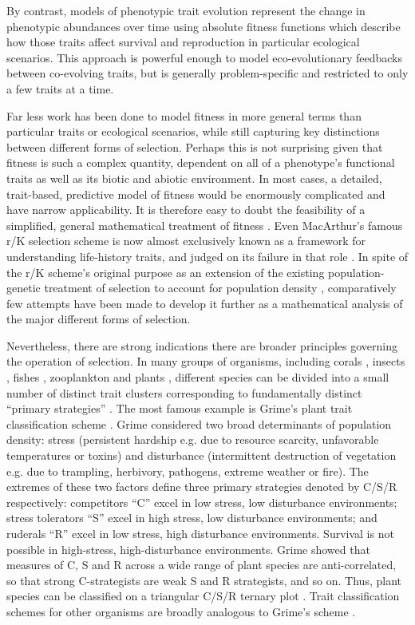 \documentclass[11pt]{article}
\begin{document}
By contrast, models of phenotypic trait evolution represent the change in phenotypic abundances over time using absolute fitness functions which describe how those traits affect survival and reproduction in particular ecological scenarios. This approach is powerful enough to model eco-evolutionary feedbacks between co-evolving traits, but is generally problem-specific and restricted to only a few traits at a time.

Far less work has been done to model fitness in more general terms than particular traits or ecological scenarios, while still capturing key distinctions between different forms of selection. Perhaps this is not surprising given that fitness is such a complex quantity, dependent on all of a phenotype's functional traits \citep{violle_2007} as well as its biotic and abiotic environment. In most cases, a detailed, trait-based, predictive model of fitness would be enormously complicated and have narrow applicability. It is therefore easy to doubt the feasibility of a simplified, general mathematical treatment of fitness \citep[p. 276]{ewens_2012}. Even MacArthur's famous r/K selection scheme is now almost exclusively known as a framework for understanding life-history traits, and judged on its failure in that role \citep{pianka_1970,stearns_1977,boyce_1984,reznick_2002}. In spite of the r/K scheme's original purpose as an extension of the existing population-genetic treatment of selection to account for population density \citep{macarthur_1962}, comparatively few attempts have been made to develop it further as a mathematical analysis of the major different forms of selection. 

Nevertheless, there are strong indications there are broader principles governing the operation of selection. In many groups of organisms, including corals \citep{darling_2012}, insects \citep{southwood_1977}, fishes \citep{winemiller_1992}, zooplankton \citep{allan_76} and plants \citep{grime_1988,westoby_1998}, different species can be divided into a small number of distinct trait clusters corresponding to fundamentally distinct ``primary strategies'' \citep{winemiller_2015}. The most famous example is Grime's plant trait classification scheme \citep{grime_1974,grime_1977,grime_1988}. Grime considered two broad determinants of population density: stress (persistent hardship e.g. due to resource scarcity, unfavorable temperatures or toxins) and disturbance (intermittent destruction of vegetation e.g. due to trampling, herbivory, pathogens, extreme weather or fire).  The extremes of these two factors define three primary strategies denoted by C/S/R respectively: competitors ``C'' excel in low stress, low disturbance environments; stress tolerators ``S'' excel in high stress, low disturbance environments; and ruderals ``R''  excel in low stress, high disturbance environments. Survival is not possible in high-stress, high-disturbance environments. Grime showed that measures of C, S and R across a wide range of plant species are anti-correlated, so that strong C-strategists are weak S and R strategists, and so on. Thus, plant species can be classified on a triangular C/S/R ternary plot \citep{grime_1974}. Trait classification schemes for other organisms are broadly analogous to Grime's scheme \citep{winemiller_2015}. 
\end{document}
